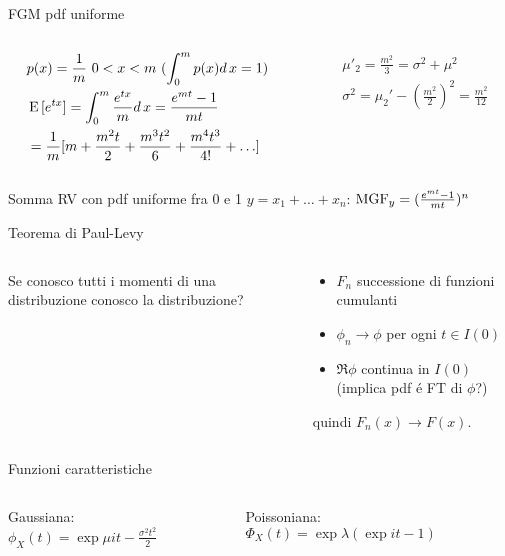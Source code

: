 \begin{wordonframe}{FGM pdf uniforme}
\begin{columns}[T]
\begin{column}{0.5\textwidth}
\begin{align*}
&p(x)=\frac{1}{m}\ 0<x<m\ (\int_0^mp(x)d\,x=1)\\
&\operatorname{E}{[e^{tx}]}=\int_0^m\frac{e^{tx}}{m}d\,x=\frac{e^{mt}-1}{mt}\\
&=\frac{1}{m}[m+\frac{m^2t}{2}+\frac{m^3t^2}{6}+\frac{m^4t^3}{4!}+\ldots]
\end{align*}
\end{column}
\begin{column}{0.5\textwidth}
\begin{align*}
&\mu'_2=\frac{m^2}{3}=\sigma^2+\mu^2\\
&\sigma^2=\mu_2'-(\frac{m^2}{2})^2=\frac{m^2}{12}
\end{align*}
\end{column}
\end{columns}
\begin{block}{Somma RV con pdf uniforme fra 0 e 1}
$y=x_1+\ldots+x_n$: $\operatorname{MGF}_y=(\frac{e^{mt}-1}{mt})^n$
\end{block}
\end{wordonframe}

\begin{frame}{Teorema di Paul-Levy}
	\begin{columns}[T]
		\begin{column}{0.3\textwidth}
			Se conosco tutti i momenti di una distribuzione conosco la distribuzione?
		\end{column}
		\begin{column}{0.7\textwidth}
			\begin{itemize}
				\item $F_n$ successione di funzioni cumulanti
				\item $\phi_n\to\phi$ per ogni $t\in I(0)$
				\item $\Re{\phi}$ continua in $I(0)$ (implica pdf \'e FT di $\phi$?)
			\end{itemize}
			quindi $F_n(x)\to F(x)$.
		\end{column}
	\end{columns}
\end{frame}

\begin{wordonframe}{Funzioni caratteristiche}
\begin{columns}[T]
	\begin{column}{0.5\textwidth}
Gaussiana: $\phi_X(t)=\exp{\mu it-\frac{\sigma^2t^2}{2}}$
	\end{column}
	\begin{column}{0.5\textwidth}
Poissoniana: $\Phi_X(t)=\exp{\lambda(\exp{it}-1)}$
	\end{column}
\end{columns}
\end{wordonframe}

